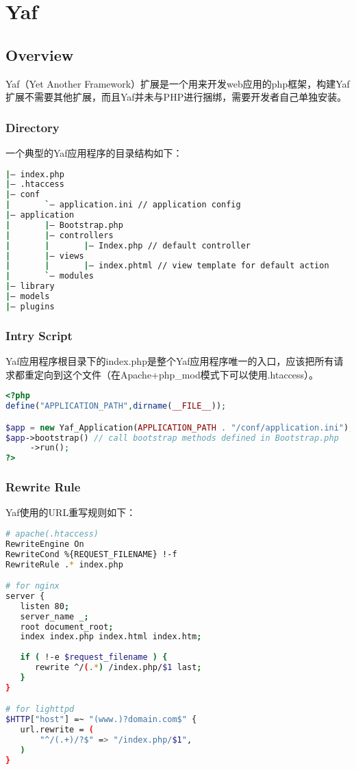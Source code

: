 \part{Yaf}


\chapter{Overview}

Yaf（Yet Another Framework）扩展是一个用来开发web应用的php框架，构建Yaf扩展不需要其他扩展，而且Yaf并未与PHP进行捆绑，需要开发者自己单独安装。


\section{Directory}


一个典型的Yaf应用程序的目录结构如下：

\begin{lstlisting}[language=bash]
|— index.php
|— .htaccess
|— conf
|       `— application.ini // application config
|— application
|       |— Bootstrap.php
|       |— controllers
|       |       |— Index.php // default controller
|       |— views
|       |       |— index.phtml // view template for default action
|       `— modules
|— library
|— models
|— plugins       
\end{lstlisting}

\section{Intry Script}


Yaf应用程序根目录下的index.php是整个Yaf应用程序唯一的入口，应该把所有请求都重定向到这个文件（在Apache+php\_mod模式下可以使用.htaccess）。



\begin{lstlisting}[language=PHP]
<?php
define("APPLICATION_PATH",dirname(__FILE__));

$app = new Yaf_Application(APPLICATION_PATH . "/conf/application.ini");
$app->bootstrap() // call bootstrap methods defined in Bootstrap.php
     ->run();
?>
\end{lstlisting}

\section{Rewrite Rule}


Yaf使用的URL重写规则如下：


\begin{lstlisting}[language=bash]
# apache(.htaccess)
RewriteEngine On
RewriteCond %{REQUEST_FILENAME} !-f
RewriteRule .* index.php

# for nginx
server {
   listen 80;
   server_name _;
   root document_root;
   index index.php index.html index.htm;
   
   if ( !-e $request_filename ) {
      rewrite ^/(.*) /index.php/$1 last;
   }
}

# for lighttpd
$HTTP["host"] =~ "(www.)?domain.com$" {
   url.rewrite = (
       "^/(.+)/?$" => "/index.php/$1",
   )
}
\end{lstlisting}


